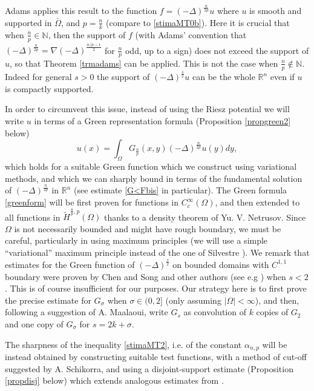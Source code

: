 \documentclass[11pt, a4paper]{article}
\newcommand{\R}{\mathbb{R}}
\begin{document}
Adams applies this result to the function $f= (-\Delta)^\frac{n}{2p}u$ where $u$ is smooth and supported in $\bar \Omega$, and $p=\frac{n}{k}$ (compare to \eqref{stimaMT0b}). Here it is crucial that when $\frac{n}{p}\in \mathbb{N}$, then the support of $f$ (with Adams' convention that $(-\Delta)^{\frac {n}{2p}}=\nabla(-\Delta)^\frac{n/p-1}{2}$ for $\frac{n}{p}$ odd, up to a sign) does not exceed the support of $u$, so that Theorem \ref{trmadams} can be applied. This is not the case when $\frac{n}{p}\not \in \mathbb{N}$. Indeed for general $s>0$ the support of $(-\Delta)^\frac{s}{2} u$ can be the whole $\R^n$ even if $u$ is compactly supported.

In order to circumvent this issue, instead of using the Riesz potential we will write $u$ in terms of a Green representation formula (Proposition \ref{propgreen2} below)
\begin{equation}\label{greenform}
u(x)=\int_{\Omega} G_\frac{n}{p}(x,y)(-\Delta)^\frac{n}{2p} u(y)dy,
\end{equation}
which holds for a suitable Green function which we construct using variational methods, and which we can sharply bound in terms of the fundamental solution of $(-\Delta)^\frac{n}{2p}$ in $\R^n$ (see estimate \eqref{G<Fbis} in particular). The Green formula \eqref{greenform} will be first proven for functions in $C^\infty_c(\Omega)$, and then extended to all functions in $\tilde H^{\frac np,p}(\Omega)$ thanks to a density theorem of Yu. V. Netrusov. Since $\Omega$ is not necessarily bounded and might have rough boundary, we must be careful, particularly in using maximum principles (we will use a simple ``variational'' maximum principle instead of the one of Silvestre \cite{Sil}). We remark that estimates for the Green function of $(-\Delta)^\frac{s}{2}$ on bounded domains with $C^{1,1}$ boundary were proven by Chen and Song \cite{CS} and other authors (see e.g \cite{Aba}) when $s<2$. This is of course insufficient for our purposes. %
Our strategy here is to first prove the precise estimate for $G_\sigma$ when $\sigma\in (0,2]$ (only assuming $|\Omega|<\infty$), and then, following a suggestion of A. Maalaoui, write $G_s$ as convolution of $k$ copies of $G_2$ and one copy of $G_\sigma$ for $s=2k+\sigma$.

The sharpness of the inequality \eqref{stimaMT2}, i.e. of the constant $\alpha_{n,p}$ will be instead obtained by constructing suitable test functions, with a method of cut-off suggested by A. Schikorra, and using a disjoint-support estimate (Proposition \ref{propdisj} below) which extends analogous estimates from \cite{MMS}.
\end{document}
